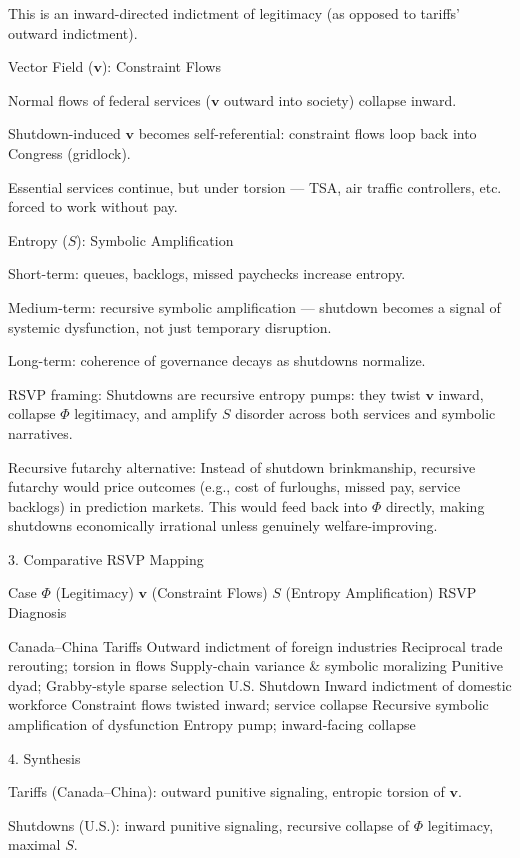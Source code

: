 \documentclass{article}
\begin{document}
This is an inward-directed indictment of legitimacy (as opposed to tariffs’ outward indictment).


Vector Field ($\mathbf{v}$): Constraint Flows

Normal flows of federal services ($\mathbf{v}$ outward into society) collapse inward.

Shutdown-induced $\mathbf{v}$ becomes self-referential: constraint flows loop back into Congress (gridlock).

Essential services continue, but under torsion — TSA, air traffic controllers, etc. forced to work without pay.


Entropy ($S$): Symbolic Amplification

Short-term: queues, backlogs, missed paychecks increase entropy.

Medium-term: recursive symbolic amplification — shutdown becomes a signal of systemic dysfunction, not just temporary disruption.

Long-term: coherence of governance decays as shutdowns normalize.


RSVP framing:
Shutdowns are recursive entropy pumps: they twist $\mathbf{v}$ inward, collapse $\Phi$ legitimacy, and amplify $S$ disorder across both services and symbolic narratives.

Recursive futarchy alternative:
Instead of shutdown brinkmanship, recursive futarchy would price outcomes (e.g., cost of furloughs, missed pay, service backlogs) in prediction markets. This would feed back into $\Phi$ directly, making shutdowns economically irrational unless genuinely welfare-improving.



3. Comparative RSVP Mapping

Case	$\Phi$ (Legitimacy)	$\mathbf{v}$ (Constraint Flows)	$S$ (Entropy Amplification)	RSVP Diagnosis

Canada–China Tariffs	Outward indictment of foreign industries	Reciprocal trade rerouting; torsion in flows	Supply-chain variance \& symbolic moralizing	Punitive dyad; Grabby-style sparse selection
U.S. Shutdown	Inward indictment of domestic workforce	Constraint flows twisted inward; service collapse	Recursive symbolic amplification of dysfunction	Entropy pump; inward-facing collapse


4. Synthesis

Tariffs (Canada–China): outward punitive signaling, entropic torsion of $\mathbf{v}$.

Shutdowns (U.S.): inward punitive signaling, recursive collapse of $\Phi$ legitimacy, maximal $S$.
\end{document}
